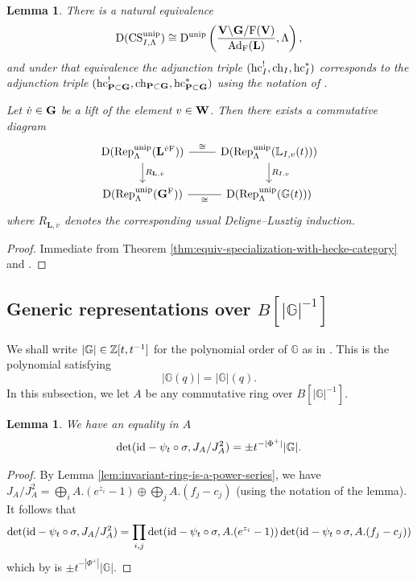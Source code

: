 \documentclass[a4paper, 10pt, oneside, reqno]{amsart}
\theoremstyle{plain}
\newtheorem{lem}[thm]{Lemma}
\theoremstyle{definition}
\theoremstyle{remark}
\newcommand{\Gbb}{\mathbb{G}}
\newcommand{\Lbb}{\mathbb{L}}
\newcommand{\Lbf}{\mathbf{L}}
\newcommand{\Pbf}{\mathbf{P}}
\newcommand{\Vbf}{\mathbf{V}}
\begin{document}
\begin{lem}\label{lem:etale-realization-gen-parab-cs}
There is a natural equivalence 
$$\DD(\CS_{I,\Lambda}^{\unip}) \cong \DD^{\unip}\left(\frac{\Vbf\backslash \Gbf/\Frob(\Vbf)}{\Ad_{\Frob}(\Lbf)}, \Lambda\right),$$
and under that equivalence the adjunction triple $(\mathrm{hc}_I^!, \mathrm{ch}_I, \mathrm{hc}_I^*)$ corresponds to the adjunction triple $(\hc_{\Pbf \subset \Gbf}^!, \ch_{\Pbf \subset \Gbf}, \hc_{\Pbf \subset \Gbf}^*)$ using the notation of \cite[Section 4]{EteveJordan}.

Let $\dot{v} \in \mathbf{G}$ be a lift of the element $v \in \mathbf{W}$. Then there exists a commutative diagram 
\[\begin{tikzcd}
	{\DD(\Rep_{\Lambda}^{\unip}(\Lbf^{\dot{v}\Frob}))} & {\DD(\Rep_{\Lambda}^{\unip}(\Lbb_{I,v}(t)))} \\
	{\DD(\Rep_{\Lambda}^{\unip}(\Gbf^{\Frob}))} & {\DD(\Rep_{\Lambda}^{\unip}(\Gbb(t)))}
	\arrow["\cong", no head, from=1-1, to=1-2]
	\arrow["{R_{\Lbf, \dot{v}}}", from=1-1, to=2-1]
	\arrow["{R_{I,v}}", from=1-2, to=2-2]
	\arrow["\cong"', no head, from=2-1, to=2-2]
\end{tikzcd}\]
where $R_{\Lbf, \dot{v}}$ denotes the corresponding usual Deligne--Lusztig induction. 
\end{lem}

\begin{proof}
Immediate from Theorem \ref{thm:equiv-specialization-with-hecke-category} and \cite[Theorem 5.1.3]{EteveJordan}.
\end{proof}

\subsection{Generic representations over $B[|\Gbb|^{-1}]$}

We shall write $|\Gbb| \in \Z[t,t^{-1}]$ for the polynomial order of $\Gbb$ as in \cite[Définition 1.9]{BroueMalle}. This is the polynomial satisfying 
$$|\Gbb(q)| = |\Gbb|(q).$$ In this subsection, we let $A$ be any commutative ring over $B[|\Gbb|^{-1}]$.

\begin{lem}\label{lem:calculation-determinant}
We have an equality in $A$ 
$$\det(\id - \psi_t \circ \sigma, J_A/J_A^2) = \pm t^{-|\Phi^+|}|\Gbb|.$$
\end{lem}

\begin{proof}
By Lemma \ref{lem:invariant-ring-is-a-power-series}, we have $J_A/J_A^2 = \bigoplus_{i} A.(e^{z_i} - 1) \oplus \bigoplus_{j} A.(f_j - c_j)$ (using the notation of the lemma). It follows that 
$$\det(\mathrm{id} - \psi_t \circ \sigma, J_A/J_A^2) = \prod_{i,j} \det(\mathrm{id} - \psi_t \circ \sigma, A.(e^{z_i} - 1))\det(\mathrm{id} - \psi_t \circ \sigma, A.(f_j - c_j))$$
which by \cite[Proposition 1.8]{BroueMalle} is $\pm t^{-|\Phi^+|}|\Gbb|$. 
\end{proof}
\end{document}
